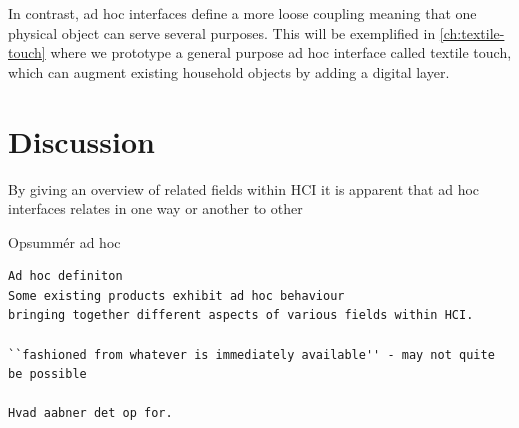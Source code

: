 In contrast, ad hoc interfaces define a more loose coupling meaning that one physical object can serve several purposes. 
This will be exemplified in \autoref{ch:textile-touch} where we prototype a general purpose ad hoc interface called textile touch, which can augment existing household objects by adding a digital layer.
\blank
{}

\section{Discussion}

By giving an overview of related fields within HCI it is apparent that ad hoc interfaces relates in one way or another to other 

Opsumm\'er ad hoc
\begin{verbatim}
Ad hoc definiton
Some existing products exhibit ad hoc behaviour 
bringing together different aspects of various fields within HCI.

``fashioned from whatever is immediately available'' - may not quite be possible

Hvad aabner det op for.

\end{verbatim}